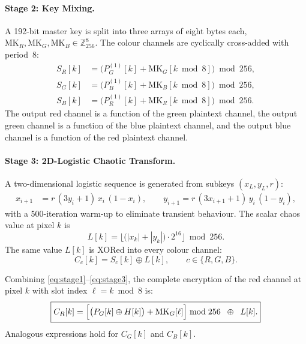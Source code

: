 \paragraph{Stage 2: Key Mixing.}
A 192-bit master key is split into three arrays of eight bytes each,
$\mathrm{MK}_R, \mathrm{MK}_G, \mathrm{MK}_B \in \mathbb{Z}_{256}^{8}$.
The colour channels are cyclically cross-added with period~8:
\begin{align}
  S_R[k] &= \bigl(P_G^{(1)}[k] + \mathrm{MK}_G[k \bmod 8]\bigr) \bmod 256,
  \label{eq:km_r}\\
  S_G[k] &= \bigl(P_B^{(1)}[k] + \mathrm{MK}_B[k \bmod 8]\bigr) \bmod 256,
  \label{eq:km_g}\\
  S_B[k] &= \bigl(P_R^{(1)}[k] + \mathrm{MK}_R[k \bmod 8]\bigr) \bmod 256.
  \label{eq:km_b}
\end{align}
The output red channel is a function of the green plaintext channel, the output
green channel is a function of the blue plaintext channel, and the output blue
channel is a function of the red plaintext channel.

\paragraph{Stage 3: 2D-Logistic Chaotic Transform.}
A two-dimensional logistic sequence is generated from subkeys $(x_L, y_L, r)$:
\begin{align}
  x_{i+1} &= r\,(3y_i + 1)\,x_i\,(1-x_i), \qquad
  y_{i+1}  = r\,(3x_{i+1}+1)\,y_i\,(1-y_i),
  \label{eq:logistic}
\end{align}
with a 500-iteration warm-up to eliminate transient behaviour. The scalar
chaos value at pixel $k$ is
\begin{equation}
  L[k] = \bigl\lfloor\bigl(|x_k|+|y_k|\bigr)\cdot 2^{16}\bigr\rfloor
          \bmod 256.
  \label{eq:logistic_val}
\end{equation}
The same value $L[k]$ is XORed into every colour channel:
\begin{equation}
  C_c[k] = S_c[k] \oplus L[k], \qquad c \in \{R,G,B\}.
  \label{eq:stage3}
\end{equation}

Combining \eqref{eq:stage1}--\eqref{eq:stage3}, the complete encryption of the
red channel at pixel $k$ with slot index $\ell = k \bmod 8$ is:
\begin{equation}
  \boxed{C_R[k] = \Bigl[\bigl(P_G[k] \oplus H[k]\bigr)
                  + \mathrm{MK}_G[\ell]\Bigr]
                  \bmod 256 \;\;\oplus\;\; L[k].}
  \label{eq:full_enc_r}
\end{equation}
Analogous expressions hold for $C_G[k]$ and $C_B[k]$.

